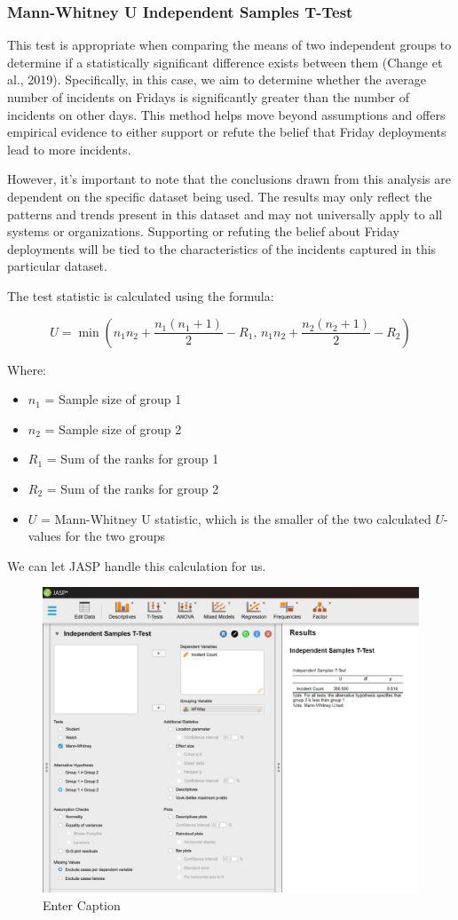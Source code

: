 \documentclass{article}
\begin{document}
\subsubsection{Mann-Whitney U Independent Samples T-Test}

This test is appropriate when comparing the means of two independent groups to determine if a statistically significant difference exists between them (Change et al., 2019). Specifically, in this case, we aim to determine whether the average number of incidents on Fridays is significantly greater than the number of incidents on other days. This method helps move beyond assumptions and offers empirical evidence to either support or refute the belief that Friday deployments lead to more incidents.

 However, it’s important to note that the conclusions drawn from this analysis are dependent on the specific dataset being used. The results may only reflect the patterns and trends present in this dataset and may not universally apply to all systems or organizations. Supporting or refuting the belief about Friday deployments will be tied to the characteristics of the incidents captured in this particular dataset.

 The test statistic is calculated using the formula:

 
\begin{equation}
U = \min \left( n_1 n_2 + \frac{n_1 (n_1 + 1)}{2} - R_1, \, n_1 n_2 + \frac{n_2 (n_2 + 1)}{2} - R_2 \right)
\end{equation}

Where:
\begin{itemize}
    \item $n_1$ = Sample size of group 1
    \item $n_2$ = Sample size of group 2
    \item $R_1$ = Sum of the ranks for group 1
    \item $R_2$ = Sum of the ranks for group 2
    \item $U$ = Mann-Whitney U statistic, which is the smaller of the two calculated \( U \)-values for the two groups
\end{itemize}

We can let JASP handle this calculation for us.

\begin{figure}[H]
    \centering
    \includegraphics[width=0.7\linewidth]{Screenshot 2024-09-28 011601.png}
    \caption{Enter Caption}
    \label{fig:enter-label}
\end{figure}
\end{document}
